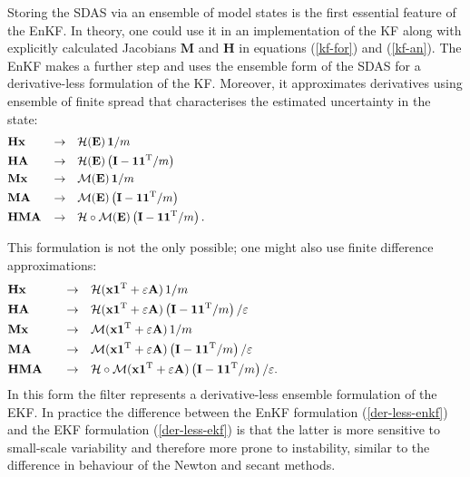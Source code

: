 \documentclass[11pt]{report}
\newcommand{\mb} {\mathbf}
\newcommand{\T}{^{\tiny \mathrm T}}
\begin{document}
Storing the SDAS via an ensemble of model states is the first essential feature of the EnKF.
In theory, one could use it in an implementation of the KF along with explicitly calculated Jacobians $\mb M$ and $\mb H$ in equations (\ref{kf-for}) and (\ref{kf-an}).
The EnKF makes a further step and uses the ensemble form of the SDAS for a derivative-less formulation of the KF.
Moreover, it approximates derivatives using ensemble of finite spread that characterises the estimated uncertainty in the state:
\begin{subequations}
  \label{der-less-enkf}
  \begin{align}
    &\mb H \mb x \quad &\to& \quad \mathcal H (\mb E) \, \mb 1 / m \hspace{10cm}\\
    &\mb H \mb A \quad &\to& \quad \mathcal H(\mb E)\left(\mb I - \mb 1 \mb 1\T / m\right)\\
    &\mb M \mb x \quad &\to& \quad \mathcal M (\mb E) \, \mb 1 / m\\
    &\mb M \mb A \quad &\to& \quad \mathcal M(\mb E)\left(\mb I - \mb 1 \mb 1\T / m\right)\\
    &\mb H \mb M \mb A &\to& \quad \mathcal H \circ \mathcal M(\mb E) \left(\mb I - \mb 1 \mb 1\T /m \right).
  \end{align}
\end{subequations}

This formulation is not the only possible; one might also use finite difference approximations:
\begin{subequations}
  \label{der-less-ekf}
  \begin{align}
    &\mb H \mb x \quad &\to& \quad \mathcal H (\mb x \mb 1\T + \varepsilon \mb A) \, 1/m \hspace{8cm}\\
    &\mb H \mb A \quad &\to& \quad \mathcal H(\mb x \mb 1\T + \varepsilon \mb A)\left(\mb I - \mb 1 \mb 1\T / m\right) / \varepsilon\\
    &\mb M \mb x \quad &\to& \quad \mathcal M (\mb x \mb 1\T + \varepsilon \mb A) \, 1/m\\
    &\mb M \mb A \quad &\to& \quad \mathcal M(\mb x \mb 1\T + \varepsilon \mb A)\left(\mb I - \mb 1 \mb 1\T / m\right) / \varepsilon\\
    &\mb H \mb M \mb A \quad &\to& \quad \mathcal H \circ \mathcal M(\mb x \mb 1\T + \varepsilon \mb A)\left(\mb I - \mb 1 \mb 1\T / m\right) / \varepsilon.
  \end{align}
\end{subequations}
In this form the filter represents a derivative-less ensemble formulation of the EKF.
In practice the difference between the EnKF formulation (\ref{der-less-enkf}) and the EKF formulation (\ref{der-less-ekf}) is that the latter is more sensitive to small-scale variability and therefore more prone to instability, similar to the difference in behaviour of the Newton and secant methods.
\end{document}
